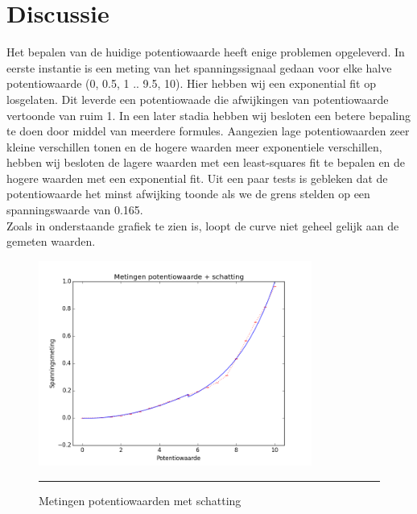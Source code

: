 \documentclass[a4paper,12pt]{article}
\begin{document}



\section{Discussie}
Het bepalen van de huidige potentiowaarde heeft enige problemen opgeleverd. In eerste instantie is een meting van het spanningssignaal gedaan voor elke halve potentiowaarde (0, 0.5, 1 .. 9.5, 10). Hier hebben wij een exponential fit op losgelaten. Dit leverde een potentiowaade die afwijkingen van potentiowaarde vertoonde van ruim 1. In een later stadia hebben wij besloten een betere bepaling te doen door middel van meerdere formules. Aangezien lage potentiowaarden zeer kleine verschillen tonen en de hogere waarden meer exponentiele verschillen, hebben wij besloten de lagere waarden met een least-squares fit te bepalen en de hogere waarden met een exponential fit. Uit een paar tests is gebleken dat de potentiowaarde het minst afwijking toonde als we de grens stelden op een spanningswaarde van 0.165.\\
Zoals in onderstaande grafiek te zien is, loopt de curve niet geheel gelijk aan de gemeten waarden.
\vspace{1em}
\begin{figure}[!htbp]
\centering
\includegraphics[width=0.8\textwidth, scale=0.8]{plot-with-estimate.png}
\vspace{1ex}
\hrule
\caption{Metingen potentiowaarden met schatting}
\end{figure}
\end{document}
